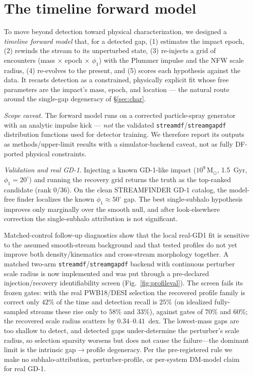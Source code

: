 \documentclass[fleqn,usenatbib]{mnras}
\newcommand{\msun}{\ensuremath{\mathrm{M}_\odot}}
\newcommand{\code}[1]{\texttt{#1}}
\begin{document}
\section{The timeline forward model}
\label{sec:fwd}
To move beyond detection toward physical characterization, we designed a \emph{timeline
forward model} that, for a detected gap, (1) estimates the impact epoch, (2) rewinds
the stream to its unperturbed state, (3) re-injects a grid of encounters (mass $\times$
epoch $\times$ $\phi_1$) with the \citet{ErkalBelokurov2015} Plummer impulse and the
NFW scale radius, (4) re-evolves to the present, and (5) scores each hypothesis against
the data. It recasts detection as a constrained, physically explicit fit whose free
parameters are the impact's mass, epoch, and location --- the natural route around the
single-gap degeneracy of \S\ref{sec:char}.

\emph{Scope caveat.} The forward model runs on a corrected particle-spray generator with
an analytic impulse kick --- \emph{not} the validated \code{streamdf}/\code{streamgapdf}
distribution functions used for detector training. We therefore report its outputs as
methods/upper-limit results with a simulator-backend caveat, not as fully DF-ported
physical constraints.

\emph{Validation and real GD-1.} Injecting a known GD-1-like impact ($10^9\,\msun$,
1.5~Gyr, $\phi_1=20^\circ$) and running the recovery grid returns the truth as the
top-ranked candidate (rank 0/36). On the clean STREAMFINDER GD-1 catalog, the model-free
finder localizes the known $\phi_1\approx50^\circ$ gap. The best single-subhalo
hypothesis improves only marginally over the smooth null, and after look-elsewhere
correction the single-subhalo attribution is not significant.

Matched-control follow-up diagnostics show that the local real-GD1 fit is sensitive to
the assumed smooth-stream background and that tested profiles do not yet improve both
density/kinematics and cross-stream morphology together. A matched two-arm
\code{streamdf}/\code{streamgapdf} backend with continuous perturber scale radius is now
implemented and was put through a pre-declared injection/recovery identifiability screen
(Fig.~\ref{fig:profileval}). The screen fails its frozen gates: with the real PWB18/DESI
selection the recovered profile family is correct only $42\%$ of the time and detection
recall is $25\%$ (on idealized fully-sampled streams these rise only to $58\%$ and
$33\%$), against gates of $70\%$ and $60\%$; the recovered scale radius scatters by
$0.34$--$0.41$~dex. The lowest-mass gaps are too shallow to detect, and detected gaps
under-determine the perturber's scale radius, so selection sparsity worsens but does not
cause the failure---the dominant limit is the intrinsic gap$\rightarrow$profile
degeneracy. Per the pre-registered rule we make no subhalo-attribution, perturber-profile,
or per-system DM-model claim for real GD-1.
\end{document}
